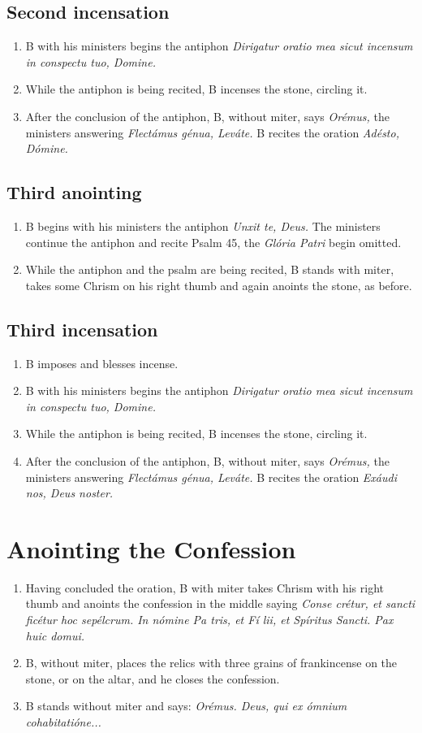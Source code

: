 \documentclass[twocolumn]{report}
\begin{document}
\subsection*{Second incensation}
\begin{enumerate}
	\item B with his ministers begins the antiphon \textit{Dirigatur oratio mea sicut incensum in conspectu tuo, Domine.}
	\item While the antiphon is being recited, B incenses the stone, circling it.
	\item After the conclusion of the antiphon, B, without miter, says \textit{Orémus,} the ministers answering \textit{Flectámus génua, Leváte.} B recites the oration \textit{Adésto, Dómine.}
\end{enumerate}
\subsection*{Third anointing}
\begin{enumerate}
	\item B begins with his ministers the antiphon \textit{Unxit te, Deus.} The ministers continue the antiphon and recite Psalm 45, the \textit{Glória Patri} begin omitted.
	\item While the antiphon and the psalm are being recited, B stands with miter, takes some Chrism on his right thumb and again anoints the stone, as before.
\end{enumerate}
\subsection*{Third incensation}
\begin{enumerate}
	\item B imposes and blesses incense.
	\item B with his ministers begins the antiphon \textit{Dirigatur oratio mea sicut incensum in conspectu tuo, Domine.}
	\item While the antiphon is being recited, B incenses the stone, circling it.
	\item After the conclusion of the antiphon, B, without miter, says \textit{Orémus,} the ministers answering \textit{Flectámus génua, Leváte.} B recites the oration \textit{Exáudi nos, Deus noster.}
\end{enumerate}
\section*{Anointing the Confession}
\begin{enumerate}
	\item Having concluded the oration, B with miter takes Chrism with his right thumb and anoints the confession in the middle saying \textit{Conse  crétur, et sancti  ficétur hoc sepélcrum. In nómine Pa  tris, et Fí  lii, et Spíritus  Sancti. Pax huic domui.}
	\item B, without miter, places the relics with three grains of frankincense on the stone, or on the altar, and he closes the confession.
	\item B stands without miter and says: \textit{Orémus. Deus, qui ex ómnium cohabitatióne...}
\end{enumerate}
\end{document}
